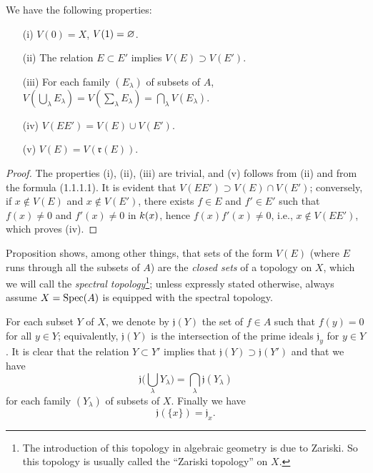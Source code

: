 \begin{prop}[1.1.2]
\label{1.1.1.2}
We have the following properties:
\begin{itemize}
  \item[{\rm(i)}] $V(0)=X$, $V(1)=\varnothing$.
  \item[{\rm(ii)}] The relation $E\subset E'$ implies $V(E)\supset V(E')$.
  \item[{\rm(iii)}] For each family $(E_\lambda)$ of subsets of $A$,
    $V(\bigcup_\lambda E_\lambda)=V(\sum_\lambda E_\lambda)=\bigcap_\lambda V(E_\lambda)$.
  \item[{\rm(iv)}] $V(EE')=V(E)\cup V(E')$.
  \item[{\rm(v)}] $V(E)=V(\mathfrak{r}(E))$.
\end{itemize}
\end{prop}

\begin{proof}
\label{proof-1.1.1.2}
The properties (i), (ii), (iii) are trivial, and (v) follows from (ii) and from
the formula (1.1.1.1). It is evident that $V(EE')\supset V(E)\cap V(E')$;
conversely, if $x\not\in V(E)$ and $x\not\in V(E')$, there exists $f\in E$ and
$f'\in E'$ such that $f(x)\neq 0$ and $f'(x)\neq 0$ in $k(x)$, hence
$f(x)f'(x)\neq 0$, i.e., $x\not\in V(EE')$, which proves (iv).
\end{proof}

\begin{rmk}
\label{1.1.1.2}
Proposition  shows, among other things, that sets of the form $V(E)$
(where $E$ runs through all the subsets of $A$) are the {\em closed sets} of a topology on
$X$, which we will call the {\em spectral topology}\footnote{The introduction of this
topology in algebraic geometry is due to Zariski. So this topology is usually called
the ``Zariski topology'' on $X$.}; unless expressly stated otherwise, always assume
$X={\mathop{\mathrm{Spec}}\nolimits}(A)$ is equipped with the spectral topology.
\end{rmk}

\begin{env}[1.1.3]
\label{1.1.1.3}
For each subset $Y$ of $X$, we denote by $\mathfrak{j}(Y)$ the set of $f\in A$ such that
$f(y)=0$ for all $y\in Y$; equivalently, $\mathfrak{j}(Y)$ is the intersection of the prime
ideals $\mathfrak{j}_y$ for $y\in Y$. It is clear that the relation $Y\subset Y'$ implies
that $\mathfrak{j}(Y)\supset\mathfrak{j}(Y')$ and that we have
\[
  \mathfrak{j}\bigg(\bigcup_\lambda Y_\lambda\bigg)=\bigcap_\lambda\mathfrak{j}(Y_\lambda)
  \tag{1.1.3.1}
\]
for each family $(Y_\lambda)$ of subsets of $X$. Finally we have
\[
  \mathfrak{j}(\{x\})=\mathfrak{j}_x.
  \tag{1.1.3.2}
\]
\end{env}


